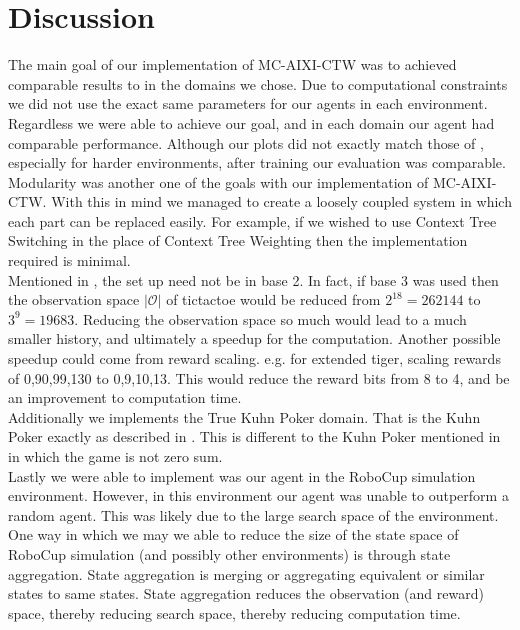 \documentclass{article}
\theoremstyle{definition}
\newtheorem{primary statistics}[definition]{Primary Statistics}
\newtheorem{auxiliary statistics}[definition]{Auxiliary Statistics}
\begin{document}
\newpage

\section{Discussion}


The main goal of our implementation of MC-AIXI-CTW was to achieved comparable results to \citep{veness2011monte} in the domains we chose. Due to computational constraints we did not use the exact same parameters for our agents in each environment. Regardless we were able to achieve our goal, and in each domain our agent had comparable performance. Although our plots did not exactly match those of \citep{veness2011monte}, especially for harder environments, after training our evaluation was comparable. \\

Modularity was another one of the goals with our implementation of MC-AIXI-CTW. With this in mind we managed to create a loosely coupled system in which each part can be replaced easily. For example, if we wished to use Context Tree Switching \citep{veness2012context} in the place of Context Tree Weighting then the implementation required is minimal. \\

Mentioned in \citep{veness2011monte}, the set up need not be in base 2. In fact, if base 3 was used then the observation space $|\mathcal{O}|$ of tictactoe would be reduced from $2^{18}=262144$ to $3^9 = 19683$. Reducing the observation space so much would lead to a much smaller history, and ultimately a speedup for the computation. Another possible speedup could come from reward scaling.  e.g. for extended tiger, scaling rewards of 0,90,99,130 to 0,9,10,13. This would reduce the reward bits from 8 to 4, and be an improvement to computation time. \\

Additionally we implements the True Kuhn Poker domain. That is the Kuhn Poker exactly as described in \citep{kuhn1950simplified}. This is different to the Kuhn Poker mentioned in  \citep{veness2011monte} in which the game is not zero sum. \\

Lastly we were able to implement was our agent in the RoboCup simulation environment. However, in this environment our agent was unable to outperform a random agent. This was likely due to the large search space of the environment. One way in which we may we able to reduce the size of the state space of RoboCup simulation (and possibly other environments) is through state aggregation. State aggregation is merging or aggregating equivalent or similar states to same states. State aggregation reduces the observation (and reward) space, thereby reducing search space, thereby reducing computation time.
\end{document}

